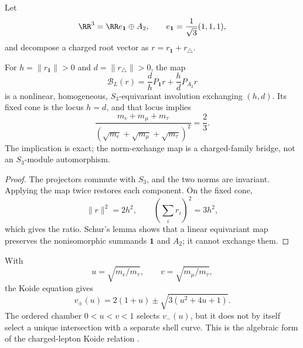 \documentclass[12pt,a4paper]{article}
\newcommand{\pvcite}[1]{\cite{#1}}
\begin{document}
Let
\[
\RR^3=\RR e_{\mathbf1}\oplus A_2,
\qquad
e_{\mathbf1}=\frac1{\sqrt3}(1,1,1),
\]
and decompose a charged root vector as
\(
r=r_{\mathbf1}+r_\triangle
\).

\begin{proposition}
\label{p6:prop:koide-implication}
For \(h=\|r_{\mathbf1}\|>0\) and \(d=\|r_\triangle\|>0\), the map
\[
\mathcal B_L(r)
=
\frac dhP_{\mathbf1}r+\frac hdP_{A_2}r
\]
is a nonlinear, homogeneous, \(S_3\)-equivariant involution exchanging
\((h,d)\).  Its fixed cone is the locus \(h=d\), and that locus implies
\[
\frac{m_e+m_\mu+m_\tau}
{(\sqrt{m_e}+\sqrt{m_\mu}+\sqrt{m_\tau})^2}
=\frac23.
\]
The implication is exact; the norm-exchange map is a charged-family bridge,
not an \(S_3\)-module automorphism.
\end{proposition}

\begin{proof}
The projectors commute with \(S_3\), and the two norms are invariant.
Applying the map twice restores each component.  On the fixed cone,
\[
\|r\|^2=2h^2,
\qquad
\left(\sum_i r_i\right)^2=3h^2,
\]
which gives the ratio.  Schur's lemma shows that a linear equivariant map
preserves the nonisomorphic summands \(\mathbf1\) and \(A_2\); it cannot
exchange them.
\end{proof}

\begin{lemma}
\label{p6:lem:ordered-koide-root}
With
\[
u=\sqrt{m_e/m_\tau},
\qquad
v=\sqrt{m_\mu/m_\tau},
\]
the Koide equation gives
\[
v_\pm(u)=2(1+u)\pm\sqrt{3(u^2+4u+1)}.
\]
The ordered chamber \(0<u<v<1\) selects \(v_-(u)\), but it does not by
itself select a unique intersection with a separate shell curve.
This is the algebraic form of the charged-lepton Koide relation
\pvcite{Koide1983}.
\end{lemma}
\end{document}
